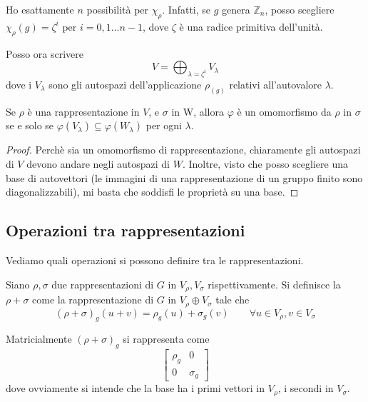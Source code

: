 \documentclass[a4paper,10pt,oneside]{math_article}
\newcommand{\Cyc}{\mathbb Z}
\renewcommand{\phi}{\varphi}
\begin{document}
    \begin{myexample}[Rappresentazioni di $\Cyc_n$]
      Ho esattamente $n$ possibilità per $\chi_\rho$. Infatti, se $g$ genera $\Cyc_n$, posso scegliere $\chi_\rho(g)=\zeta^i$ per $i=0,1\dots n-1$, dove $\zeta$ è una radice primitiva dell'unità.
     
      Posso ora scrivere
      \[
       V=\bigoplus_{\lambda=\zeta^i}V_\lambda
      \]
      dove i $V_\lambda$ sono gli autospazi dell'applicazione $\rho_(g)$ relativi all'autovalore $\lambda$.
      
      Se $\rho$ è una rappresentazione in $V$, e $\sigma$ in W, allora $\phi$ è un omomorfismo da $\rho$ in $\sigma$ se e solo se $\phi(V_\lambda)\subseteq \phi(W_\lambda)$ per ogni $\lambda$.
      
      \begin{proof}
       Perchè sia un omomorfismo di rappresentazione, chiaramente gli autospazi di $V$ devono andare negli autospazi di $W$. Inoltre, visto che posso scegliere una base di autovettori (le immagini di una rappresentazione di un gruppo finito sono diagonalizzabili), mi basta che soddisfi le proprietà su una base.
      \end{proof}


    \end{myexample}
    
  \subsection{Operazioni tra rappresentazioni}
    Vediamo quali operazioni si possono definire tra le rappresentazioni.
    
    \begin{mydef}
     Siano $\rho, \sigma$ due rappresentazioni di $G$ in $V_\rho,V_\sigma$ rispettivamente. Si definisce la  $\rho+\sigma$ come la rappresentazione di $G$ in $V_\rho\oplus V_\sigma$ tale che 
     \[
      (\rho+\sigma)_g(u+v)=\rho_g(u)+\sigma_g(v)\qquad \forall u\in V_\rho, v\in V_\sigma
     \]
    \end{mydef}
    
    Matricialmente $(\rho+\sigma)_g$ si rappresenta come
    \[
     \left[\begin{array}{c|c}
	    \rho_g & 0 \\
	    \hline
	    0 & \sigma_g
           \end{array}
     \right]
    \]
    dove ovviamente si intende che la base ha i primi vettori in $V_\rho$, i secondi in $V_\sigma$.
    
\end{document}
